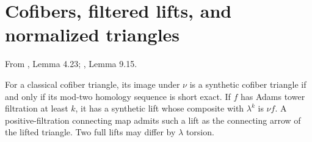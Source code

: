 \section{Cofibers, filtered lifts, and normalized triangles}

\begin{theorem}
\label{sem:Literature:cofiber-and-lift}
From \cite{Pst}, Lemma 4.23; \cite{BHS}, Lemma 9.15.\par

For a classical cofiber triangle, its image under $\nu$ is a synthetic cofiber triangle if and only if its mod-two homology sequence is short exact. If $f$ has Adams tower filtration at least $k$, it has a synthetic lift whose composite with $\lambda^k$ is $\nu f$. A positive-filtration connecting map admits such a lift as the connecting arrow of the lifted triangle. Two full lifts may differ by $\lambda$ torsion.
\end{theorem}

